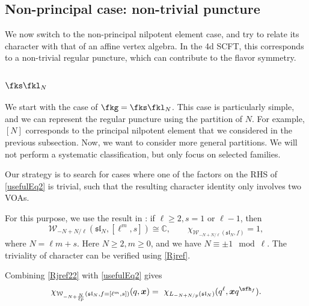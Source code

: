 \documentclass[a4paper,11pt]{article}
\theoremstyle{definition}
\theoremstyle{definition}
\theoremstyle{remark}
\newcommand{\be}{\begin{equation}}
\newcommand{\ee}{\end{equation}}
\begin{document}


\subsection{Non-principal   case: non-trivial puncture}

We now switch to the non-principal nilpotent element  case, and try to relate its character with that of an affine vertex algebra. 
 In  the 4d SCFT, this corresponds to a non-trivial regular puncture, which can contribute to the flavor symmetry. 
 
 

\subsubsection{$\fks\fkl_N$}

 We start with the    case of $\fkg=\fks\fkl_N$.  This case is particularly simple, and we can represent the regular puncture using the partition of $N$. For example, $[N]$ corresponds to the principal nilpotent element that we considered in the previous subsection. Now, we want  to consider more   general   partitions.   We will not  perform a systematic classification, but only focus on   selected  families.

 
Our strategy is to search for cases      where one of the factors on the RHS of \eqref{usefulEq2} is trivial, such that the resulting character identity only involves two VOAs. 
 
 
For this purpose, we use the result in \cite[Theorem~8.7]{Arakawa:2021ogm}:  %
if $\ell\ge 2, s=1 $ or $\ell-1$, then 
\be\label{Rjref22}
\mathcal{W}_{-N+N/\ell}(\mathfrak{sl}_N, [\ell^m, s]) \cong \mathbb{C}, \qquad
\chi_{\mathcal{W}_{-N+N/\ell}(\mathfrak{sl}_N, f) }=1,
\ee
where $N=\ell m+s$. 
Here $N\ge 2, m\ge 0$, and we have $N\equiv \pm 1 \mod \ell$.
The triviality of character can be verified using \eqref{Rjref}. 

Combining \eqref{Rjref22} with  \eqref{usefulEq2} gives
  \be
 \chi_{\mathcal{W}_{-N+\frac{N }{\ell p}}(\mathfrak{sl}_N, f=[\ell^m, s]) }(q,\bm x)
 =\ 
 {\chi_{L_{-N+N/p}(\mathfrak{sl}_N)}} (q^\ell,\bm x q^{\sfh_f}). %
\ee
\end{document}
